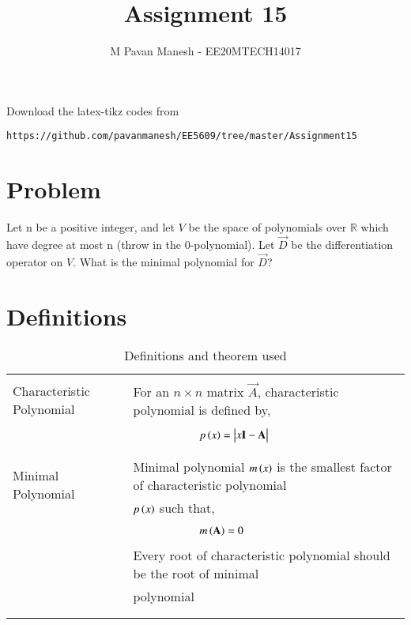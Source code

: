 \documentclass[journal,12pt]{IEEEtran}
\begin{document}
     \def\rightbox#1{\makebox[0in][r]{#1}}
     \def\centbox#1{\makebox[0in]{#1}}
     \def\topbox#1{\raisebox{-\baselineskip}[0in][0in]{#1}}
     \def\midbox#1{\raisebox{-0.5\baselineskip}[0in][0in]{#1}}
\vspace{3cm}
\title{Assignment 15}
\author{M Pavan Manesh - EE20MTECH14017}
\maketitle
\bigskip
\renewcommand{\thefigure}{\theenumi}
\renewcommand{\thetable}{\theenumi}
%
Download the latex-tikz codes from 
%
\begin{lstlisting}
https://github.com/pavanmanesh/EE5609/tree/master/Assignment15
\end{lstlisting}
\section{\textbf{Problem}}
 Let n be a positive integer, and let $V$ be the space of polynomials over $\mathbb{R}$ which have degree at most n (throw in
the 0-polynomial). Let $\vec{D}$ be the differentiation operator on $V$. What is the minimal polynomial for $\vec{D}$?
\section{\textbf{Definitions}}
\renewcommand{\thetable}{1}
\begin{longtable}{|l|l|}
	\hline
	\multirow{3}{*}{Characteristic Polynomial} 
	& \\
	& For an $n\times n$ matrix $\vec{A}$, characteristic polynomial is defined by,\\
	&\\
	& $\qquad\qquad\qquad p\brak{x}=\mydet{x\Vec{I}-\Vec{A}}$\\
	&\\
	\hline
	\multirow{3}{*}{Minimal Polynomial} 
	&\\
	& Minimal polynomial $m\left(x\right)$ is the smallest factor of characteristic polynomial\\
	& $p\left(x\right)$ such that,\\
	&\\
	& $\qquad \qquad \qquad m\left(\mathbf{A}\right)=0$\\
	& \\
	& Every root of characteristic polynomial should be the root of minimal\\
	& polynomial\\
	&\\
    \hline
    \caption{Definitions and theorem used}
    \label{table:1}
\end{longtable}
\newpage
\end{document}
